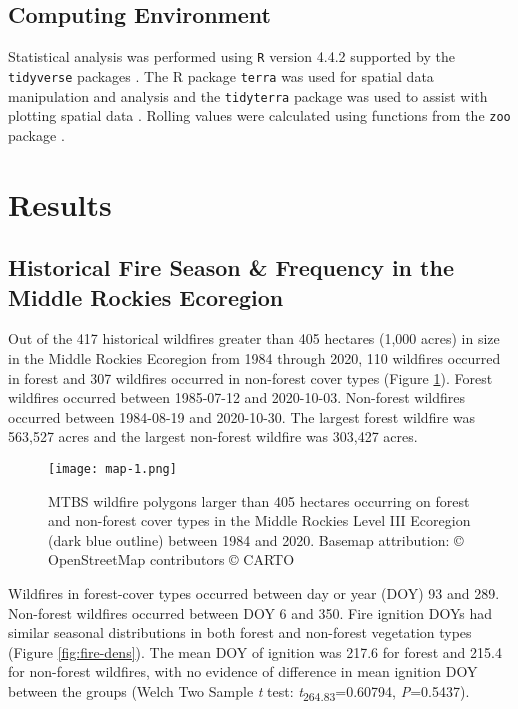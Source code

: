 \documentclass[11p]{article}
\begin{document}
\begin{table}
{\subsection{Computing Environment}

Statistical analysis was performed using \texttt{R} version 4.4.2 \citep{rcoreteamLanguageEnvironmentStatistical2024} supported by the \texttt{tidyverse} packages \citep{hernangomezUsingTidyverseTerra2023} . The R package \texttt{terra} was used for spatial data manipulation and analysis \citep{hijmansTerraSpatialData2024} and the \texttt{tidyterra} package was used to assist with plotting spatial data \citep{hernangomezUsingTidyverseTerra2023}. Rolling values were calculated using functions from the \texttt{zoo} package \citep{zeileisZooS3Infrastructure2005}.  

\section{Results}

\subsection{Historical Fire Season \& Frequency in the Middle Rockies Ecoregion}

Out of the 417 historical wildfires greater than 405 hectares (1,000 acres) in size in the Middle Rockies Ecoregion from 1984 through 2020, 110 wildfires occurred in forest and 307 wildfires occurred in non-forest cover types (Figure \ref{fig:map}). Forest wildfires occurred between 1985-07-12 and 2020-10-03. Non-forest wildfires occurred between 1984-08-19 and 2020-10-30. The largest forest wildfire was 563,527 acres and the largest non-forest wildfire was 303,427 acres.

\begin{figure}[htbp]
  \texttt{[image: map-1.png]}
  \caption{MTBS wildfire polygons larger than 405 hectares occurring on forest and non-forest cover types in the Middle Rockies Level III Ecoregion (dark blue outline) between 1984 and 2020. Basemap attribution: © OpenStreetMap contributors © CARTO}
  \label{fig:map}
\end{figure}

Wildfires in forest-cover types occurred between day or year (DOY) 93 and 289. Non-forest wildfires occurred between DOY 6 and 350. Fire ignition DOYs had similar seasonal distributions in both forest and non-forest vegetation types (Figure \ref{fig:fire-dens}). The mean DOY of ignition was 217.6 for forest and 215.4 for non-forest wildfires, with no evidence of difference in mean ignition DOY between the groups (Welch Two Sample \textit{t} test: \textit{t}\textsubscript{264.83}=0.60794, \textit{P}=0.5437).

}
\end{table}
\end{document}
